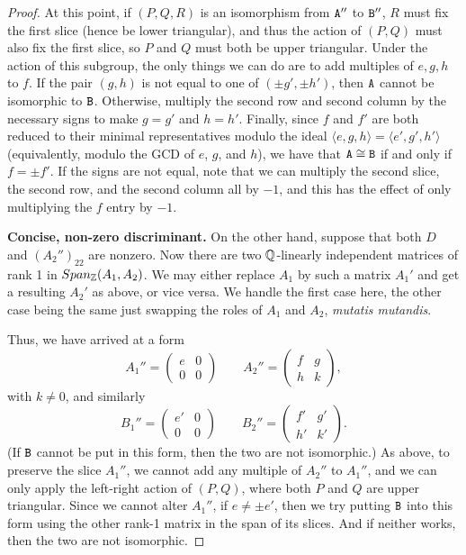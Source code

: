 \begin{proof}
At this point, if $(P,Q,R)$ is an isomorphism from $\mathtt{A}''$ to $\mathtt{B}''$, $R$ must fix the first slice (hence be lower triangular), and thus the action of $(P,Q)$ must also fix the first slice, so $P$ and $Q$ must both be upper triangular. Under the action of this subgroup, the only things we can do are to add multiples of $e,g,h$ to $f$. If the pair $(g,h)$ is not equal to one of $(\pm g', \pm h')$, then $\mathtt{A}$ cannot be isomorphic to $\mathtt{B}$. Otherwise, multiply the second row and second column by the necessary signs to make $g = g'$ and $h = h'$. Finally, since $f$ and $f'$ are both reduced to their minimal representatives modulo the ideal $\langle e,g,h \rangle = \langle e', g', h' \rangle$ (equivalently, modulo the GCD of $e$, $g$, and $h$), we have that $\mathtt{A} \cong \mathtt{B}$ if and only if $f = \pm f'$. If the signs are not equal, note that we can multiply the second slice, the second row, and the second column all by $-1$, and this has the effect of only multiplying the $f$ entry by $-1$. 

\textbf{Concise, non-zero discriminant.} On the other hand, suppose that both $D$ and $(A_2'')_{22}$ are nonzero. Now there are two $\mathbb{Q}$-linearly independent matrices of rank 1 in $Span_{\mathbb{Z}}(A_1, A_2)$. We may either replace $A_1$ by such a matrix $A_1'$ and get a resulting $A_2'$ as above, or vice versa. We handle the first case here, the other case being the same just swapping the roles of $A_1$ and $A_2$, \emph{mutatis mutandis}. 

Thus, we have arrived at a form
\[
A_1'' = \begin{pmatrix} e & 0 \\ 0 & 0 \end{pmatrix} \qquad A_2'' = \begin{pmatrix} f & g \\ h & k \end{pmatrix},
\]
with $k \neq 0$, and similarly
\[
B_1'' = \begin{pmatrix} e' & 0 \\ 0 & 0 \end{pmatrix} \qquad B_2'' = \begin{pmatrix} f' & g' \\ h' & k' \end{pmatrix}.
\]
(If $\mathtt{B}$ cannot be put in this form, then the two are not isomorphic.) As above, to preserve the slice $A_1''$, we cannot add any multiple of $A_2''$ to $A_1''$, and we can only apply the left-right action of $(P,Q)$, where both $P$ and $Q$ are upper triangular. Since we cannot alter $A_1''$, if $e \neq \pm e'$, then we try putting $\mathtt{B}$ into this form using the other rank-1 matrix in the span of its slices. And if neither works, then the two are not isomorphic. 


\end{proof}
